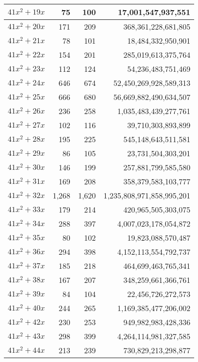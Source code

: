 \documentclass[a4paper]{amsproc}
\theoremstyle{plain}
\begin{document}
\begin{longtable}{ | l | r | r | r | }
$41x^2 + 19x$ & 75 & 100 & 17{,}001{,}547{,}937{,}551 \\ \hline
$41x^2 + 20x$ & 171 & 209 & 368{,}361{,}228{,}681{,}805 \\ \hline
$41x^2 + 21x$ & 78 & 101 & 18{,}484{,}332{,}950{,}901 \\ \hline
$41x^2 + 22x$ & 154 & 201 & 285{,}019{,}613{,}375{,}764 \\ \hline
$41x^2 + 23x$ & 112 & 124 & 54{,}236{,}483{,}751{,}469 \\ \hline
$41x^2 + 24x$ & 646 & 674 & 52{,}450{,}269{,}928{,}589{,}313 \\ \hline
$41x^2 + 25x$ & 666 & 680 & 56{,}669{,}882{,}490{,}634{,}507 \\ \hline
$41x^2 + 26x$ & 236 & 258 & 1{,}035{,}483{,}439{,}277{,}761 \\ \hline
$41x^2 + 27x$ & 102 & 116 & 39{,}710{,}303{,}893{,}899 \\ \hline
$41x^2 + 28x$ & 195 & 225 & 545{,}148{,}643{,}511{,}581 \\ \hline
$41x^2 + 29x$ & 86 & 105 & 23{,}731{,}504{,}303{,}201 \\ \hline
$41x^2 + 30x$ & 146 & 199 & 257{,}881{,}799{,}585{,}580 \\ \hline
$41x^2 + 31x$ & 169 & 208 & 358{,}379{,}583{,}103{,}777 \\ \hline
$41x^2 + 32x$ & 1{,}268 & 1{,}620 & 1{,}235{,}808{,}971{,}858{,}995{,}201 \\ \hline
$41x^2 + 33x$ & 179 & 214 & 420{,}965{,}505{,}303{,}075 \\ \hline
$41x^2 + 34x$ & 288 & 397 & 4{,}007{,}023{,}178{,}054{,}872 \\ \hline
$41x^2 + 35x$ & 80 & 102 & 19{,}823{,}088{,}570{,}487 \\ \hline
$41x^2 + 36x$ & 294 & 398 & 4{,}152{,}113{,}554{,}792{,}737 \\ \hline
$41x^2 + 37x$ & 185 & 218 & 464{,}699{,}463{,}765{,}341 \\ \hline
$41x^2 + 38x$ & 167 & 207 & 348{,}259{,}661{,}366{,}761 \\ \hline
$41x^2 + 39x$ & 84 & 104 & 22{,}456{,}726{,}272{,}573 \\ \hline
$41x^2 + 40x$ & 244 & 265 & 1{,}169{,}385{,}477{,}206{,}002 \\ \hline
$41x^2 + 42x$ & 230 & 253 & 949{,}982{,}983{,}428{,}336 \\ \hline
$41x^2 + 43x$ & 298 & 399 & 4{,}264{,}114{,}981{,}327{,}585 \\ \hline
$41x^2 + 44x$ & 213 & 239 & 730{,}829{,}213{,}298{,}877 \\ \hline

\end{longtable}
\end{document}
